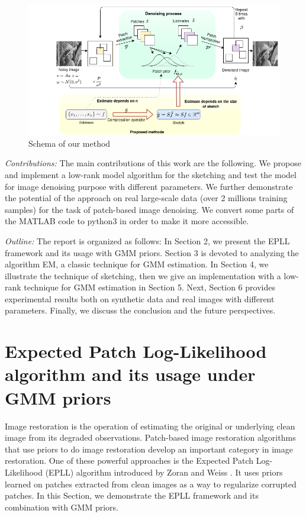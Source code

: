 \documentclass[12pt,a4paper]{article}
\begin{document}
\begin{figure}[h]
    \centering
    \includegraphics[scale = 0.5]{shema_en.png}
    \caption{Schema of our method}
    \label{fig:shema}
\end{figure}

\textit{Contributions:} The main contributions of this work are the following.
We propose and implement a low-rank model algorithm for the sketching and test the model for image denoising purpose with different parameters.
We further demonstrate the potential of the approach on real large-scale data (over 2 millions training samples) for the task of patch-based image denoising.
We convert some parts of the MATLAB code to python3 in order to make it more accessible.

\textit{Outline:}
The report is organized as follows:
In Section 2, we present the EPLL framework and its usage with GMM priors.
Section 3 is devoted to analyzing the algorithm EM, a classic technique for GMM estimation.
In Section 4, we illustrate the technique of sketching, then we give an implementation with a low-rank technique for GMM estimation in Section 5.
Next, Section 6 provides experimental results both on synthetic data and real images with different parameters.
Finally, we discuss the conclusion and the future perspectives.


\section{Expected Patch Log\hyp{}Likelihood algorithm and its usage under GMM priors}
Image restoration is the operation of estimating the original or underlying clean image from its degraded observations.
Patch-based image restoration algorithms that use priors to do image restoration develop an important category in image restoration.
One of these powerful approaches is the Expected Patch Log\hyp{}Likelihood (EPLL) algorithm introduced by Zoran and Weiss \cite{Zoran}.
It uses priors learned on patches extracted from clean images as a way to regularize corrupted patches.
In this Section, we demonstrate the EPLL framework and its combination with GMM priors.
\end{document}
